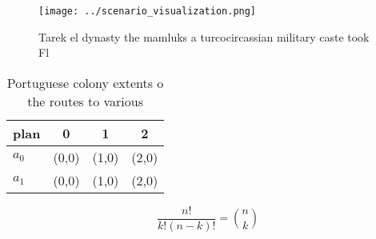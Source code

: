 \documentclass[a4paper]{article}
\begin{document}
\begin{figure}[H]
\centering
\texttt{[image: ../scenario\_visualization.png]}
\caption{Tarek el dynasty the mamluks a turcocircassian military caste took Fl
}
\end{figure}
 
\begin{table}
\begin{adjustbox}{width=0.6\columnwidth}
\begin{tabular}{|l|l|l|l|}
\hline
\textbf{plan} & \multicolumn{1}{c|}{\textbf{0}} & \multicolumn{1}{c|}{\textbf{1}} & \multicolumn{1}{c|}{\textbf{2}} \\ \hline
\textbf{$a_0$}  & (0,0) & (1,0) & (2,0) \\ \hline
\textbf{$a_1$}  & (0,0) & (1,0) & (2,0) \\ \hline
\end{tabular}
\end{adjustbox}
\caption{Portuguese colony extents o the routes to various
}
\end{table}

\[ \frac{n!}{k!(n-k)!} = \binom{n}{k} \]
\end{document}
